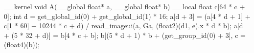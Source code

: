 __kernel void A(__global float* a, __global float* b) {
  __local float c[64 * c + 0];
  int d = get_global_id(0) + get_global_id(1) * 16;
  a[d + 3] = (a[4 * d + 1] + c[1 * 60] + 10244 * c + d) / read_imageui(a, Ga, (float2)(d1, e).x * d * b);
  a[d + (5 * 32 + d)] = b[4 * c + b];
  b[(5 * d + 1) * b + (get_group_id(0) + 3], c = (float4)(b));
}

